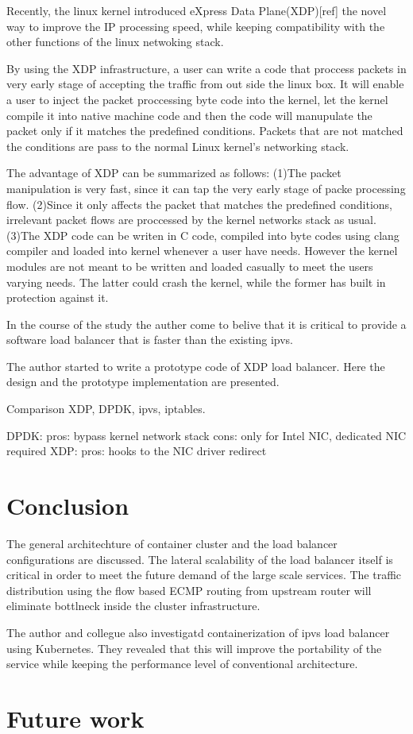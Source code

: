 Recently, the linux kernel introduced eXpress Data Plane(XDP)[ref] the novel way to improve the IP processing speed, while keeping compatibility with the other functions of the linux netwoking stack.

By using the XDP infrastructure, a user can write a code that proccess packets in very early stage of accepting the traffic from out side the linux box.
It will enable a user to inject the packet proccessing byte code into the kernel, let the kernel compile it into native machine code and then the code will manupulate the packet only if it matches the predefined conditions.
Packets that are not matched the conditions are pass to the normal Linux kernel's networking stack.

The advantage of XDP can be summarized as follows:
(1)The packet manipulation is very fast, since it can tap the very early stage of packe processing flow.
(2)Since it only affects the packet that matches the predefined conditions, irrelevant packet flows are proccessed by the kernel networks stack as usual.
(3)The XDP code can be writen in C code, compiled into byte codes using clang compiler and loaded into kernel whenever a user have needs.
However the kernel modules are not meant to be written and loaded casually to meet the users varying needs.
The latter could crash the kernel, while the former has built in protection against it.

In the course of the study the auther come to belive that it is critical to provide a software load balancer that is faster than the existing ipvs.

The author started to write a prototype code of XDP load balancer.
Here the design and the prototype implementation are presented.




Comparison XDP, DPDK, ipvs, iptables.

DPDK: pros: bypass kernel network stack cons: only for Intel NIC, dedicated NIC required
XDP: pros: hooks to the NIC driver redirect 

\section{Conclusion}\label{Conclusion}
The general architechture of container cluster and the load balancer configurations are discussed.
The lateral scalability of the load balancer itself is critical in order to meet the future demand of the large scale services. The traffic distribution using the flow based ECMP routing from upstream router will eliminate bottlneck inside the cluster infrastructure.

The author and collegue also investigatd containerization of ipvs load balancer using Kubernetes.
They revealed that this will improve the portability of the service while keeping the performance level of conventional architecture.




\section{Future work}\label{Future work}




